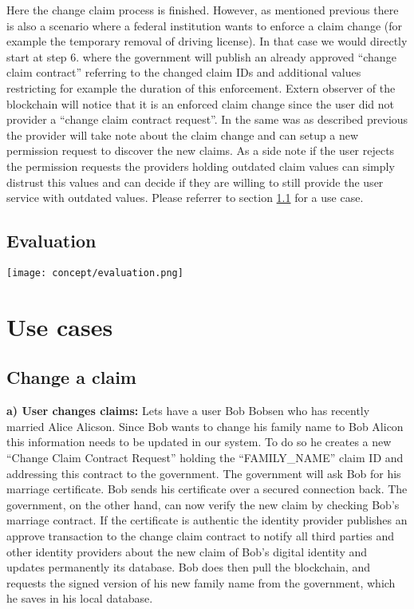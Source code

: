 Here the change claim process is finished. However, as mentioned previous there is also a scenario where a federal institution wants to enforce a claim change (for example the temporary removal of driving license). In that case we would directly start at step 6. where the government will publish an already approved “change claim contract” referring to the changed claim IDs and additional values restricting for example the duration of this enforcement. Extern observer of the blockchain will notice that it is an enforced claim change since the user did not provider a “change claim contract request”. In the same was as described previous the provider will take note about the claim change and can setup a new permission request to discover the new claims. As a side note if the user rejects the permission requests the providers holding outdated claim values can simply distrust this values and can decide if they are willing to still provide the user service with outdated values. Please referrer to section \ref{sec:changeClaimUseCase} for a use case.

\subsection{Evaluation}

 \texttt{[image: concept/evaluation.png]}
 
\section{Use cases}

\subsection{Change a claim}
\label{sec:changeClaimUseCase}
\textbf{a) User changes claims:}
Lets have a user Bob Bobsen who has recently married Alice Alicson. Since Bob wants to change his family name to Bob Alicon this information needs to be updated in our system. To do so he creates a new “Change Claim Contract Request” holding the “FAMILY\_NAME” claim ID and addressing this contract to the government. The government will ask Bob for his marriage certificate. Bob sends his certificate over a secured connection back. The government, on the other hand, can now verify the new claim by checking Bob's marriage contract. If the certificate is authentic the identity provider publishes an approve transaction to the change claim contract to notify all third parties and other identity providers about the new claim of Bob's digital identity and updates permanently its database. 
Bob does then pull the blockchain, and requests the signed version of his new family name from the government, which he saves in his local database.

